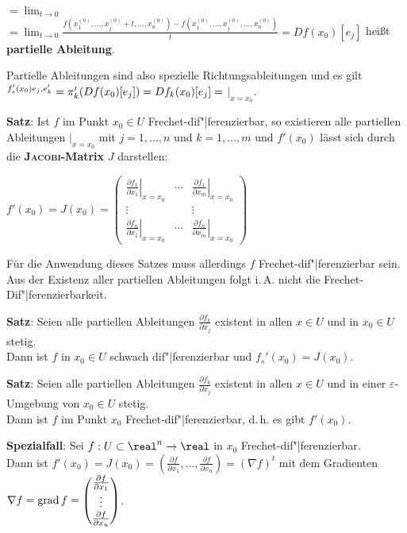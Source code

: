  $=
\lim_{t \to 0}$  $=
\lim_{t \to 0} \frac{f(x_1^{(0)}, \dotsc, x_j^{(0)} + t, \dotsc, x_n^{(0)}) -
f(x_1^{(0)}, \dotsc, x_j^{(0)}, \dotsc, x_n^{(0)})}{t} =
Df(x_0)[e_j]$
heißt \textbf{partielle Ableitung}.

Partielle Ableitungen sind also spezielle Richtungsableitungen und es gilt \\
$\sp{f_s'(x_0)e_j, e_k'} = \pi_k'(Df(x_0)[e_j]) = Df_k(x_0)[e_j] =$
$\Big|_{x=x_0}$.

\linie

\textbf{Satz}:
Ist $f$ im Punkt $x_0 \in U$ Frechet-dif"|ferenzierbar, so existieren
alle partiellen Ableitungen
$\Big|_{x=x_0}$
mit $j = 1, \dotsc, n$ und $k = 1, \dotsc, m$
und $f'(x_0)$ lässt sich durch die \textbf{\textsc{Jacobi}-Matrix} $J$
darstellen:

$f'(x_0) = J(x_0) = \begin{pmatrix}
\left.\frac{\partial f_1}{\partial x_1}\right|_{x=x_0} &
\cdots &
\left.\frac{\partial f_1}{\partial x_m}\right|_{x=x_0} \\
\vdots & & \vdots \\
\left.\frac{\partial f_n}{\partial x_1}\right|_{x=x_0} &
\cdots &
\left.\frac{\partial f_n}{\partial x_m}\right|_{x=x_0}
\end{pmatrix}$

Für die Anwendung dieses Satzes muss allerdings $f$ Frechet-dif"|ferenzierbar
sein.
Aus der Existenz aller partiellen Ableitungen folgt i.\,A. nicht
die Frechet-Dif"|ferenzierbarkeit.

\linie

\textbf{Satz}:
Seien alle partiellen Ableitungen $\frac{\partial f_k}{\partial x_j}$
existent in allen $x \in U$ und in $x_0 \in U$ stetig. \\
Dann ist $f$ in $x_0 \in U$ schwach dif"|ferenzierbar
und $f_s'(x_0) = J(x_0)$.

\textbf{Satz}:
Seien alle partiellen Ableitungen $\frac{\partial f_k}{\partial x_j}$
existent in allen $x \in U$ und in einer $\varepsilon$-Umgebung von
$x_0 \in U$ stetig. \\
Dann ist $f$ im Punkt $x_0$ Frechet-dif"|ferenzierbar,
d.\,h. es gibt $f'(x_0)$.

\linie

\textbf{Spezialfall}:
Sei $f: U \subset \real^n \rightarrow \real$ in $x_0$
Frechet-dif"|ferenzierbar. \\
Dann ist $f'(x_0) = J(x_0) = (\frac{\partial f}{\partial x_1}, \dotsc,
\frac{\partial f}{\partial x_n}) = (\nabla f)^t$ mit dem Gradienten
$\nabla f = \operatorname{grad} f = \begin{pmatrix}\frac{\partial f}{\partial x_1} \\
\vdots \\ \frac{\partial f}{\partial x_n}\end{pmatrix}$.

